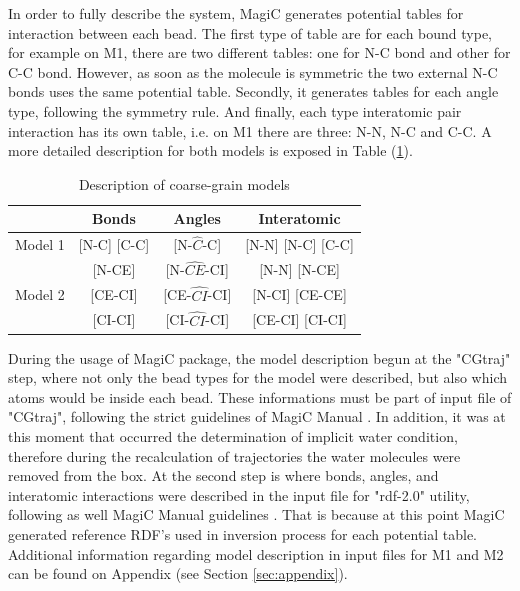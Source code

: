 \documentclass[10pt,a4paper,twoside]{article}
\begin{document}
 In order to fully describe the system, MagiC generates potential tables for interaction between each bead. The first type of table are for each bound type, for example on M1, there are two different tables: one for N-C bond and other for C-C bond. However, as soon as the molecule is symmetric the two external N-C bonds uses the same potential table. Secondly, it generates tables for each angle type, following the symmetry rule. And finally, each type interatomic pair interaction has its own table, i.e. on M1 there are three: N-N, N-C and C-C. A more detailed description for both models is exposed in Table (\ref{tab:potdes}).
  
 \begin{table}[ht!] 
  \centering
\begin{threeparttable}

  \caption{Description of coarse-grain models}

    \begin{tabular}{c|c|c|c}
    \toprule
    &  Bonds & Angles & Interatomic \\
    \midrule
    Model 1   & [N-C] [C-C]  & [N-$\widehat{C}$-C]  & [N-N] [N-C] [C-C]  \\
    \midrule
      			& [N-CE]  & [N-$\widehat{CE}$-CI]  & [N-N] [N-CE]   \\
      Model 2	& [CE-CI] &  [CE-$\widehat{CI}$-CI] &  [N-CI] [CE-CE]   \\
     			 & [CI-CI]  &  [CI-$\widehat{CI}$-CI] &  [CE-CI] [CI-CI]  \\
    \bottomrule
    \end{tabular}%
  \label{tab:potdes}%
\end{threeparttable} 
\end{table}

 During the usage of MagiC package, the model description begun at the "CGtraj" step, where  not only the bead types for the model were described, but also which atoms would be inside each bead. These informations must be part of input file of "CGtraj", following the strict guidelines of MagiC Manual \cite{magicmanu}. In addition, it was at this moment that occurred the determination of implicit water condition, therefore during the recalculation of trajectories the water molecules were removed from the box. At the second step is where bonds, angles, and interatomic interactions were described in the input file for "rdf-2.0" utility, following as well MagiC Manual guidelines \cite{magicmanu}.  That is because at this point MagiC generated reference RDF's used in inversion process for each potential table. Additional information regarding model description in input files for M1 and M2 can be found on Appendix (see Section \ref{sec:appendix}).
 
\end{document}
